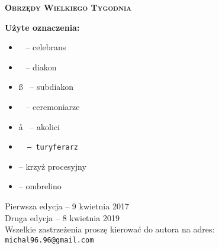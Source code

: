 \begin{center}
	\vspace*{2cm}

 	\hrulefill
	
	\vspace{0.7cm}
	

		\textbf{\textsc{{\Huge{Obrzędy Wielkiego Tygodnia}}\\}}
	
	\vspace{0.5cm}
	
	\hrulefill

	\vspace{\fill}	

	 {\large \textbf{Użyte oznaczenia:}} \\
	
	 \vspace{0.1\textwidth}
	 
	 {\large\centering
	   \begin{itemize}[leftmargin=.43\linewidth,rightmargin=.35\linewidth,label=]
	    \item \ii~ -- celebrans 
	    \item \dd~ -- diakon 
	    \item \ss~ -- subdiakon
 	    \item \cc~ -- ceremoniarze 
	    \item \aa~ -- akolici 
	    \item \tt~ -- turyferarz 
	    \item {} -- krzyż procesyjny
	    \item \oo -- ombrelino
	  \end{itemize}
	 }
	
	\vspace{5cm}	
	
	\hrulefill
	
	{\footnotesize Pierwsza edycja -- 9 kwietnia 2017\\
	Druga edycja -- 8 kwietnia 2019 \\
	Wszelkie zastrzeżenia proszę kierować do autora na adres: \texttt{michal96.96@gmail.com}}

	\newpage
\end{center}

	